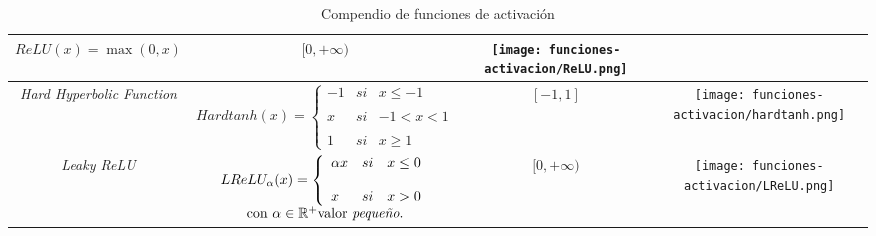 \begin{table}[H]
{\begin{tabular}{| c | c | c | c |}
        $ReLU(x) = \max(0,x)$
        & %
        $[0,+\infty)$
        & %
        \begin{minipage}{\coeficienteAncho\textwidth}
            \texttt{[image: funciones-activacion/ReLU.png]}
        \end{minipage}
        \\
        \hline
        \textit{Hard Hyperbolic Function}
        & %
        $Hardtanh(x) =\left\{ \begin{array}{lcc}
            -1 &   si  & x \leq -1 \\
            \\ x &  si & -1< x < 1 \\
            \\ 1&  si  & x \geq 1 
            \end{array}
        \right.$
        & %
        $[-1,1]$
        & %
        \begin{minipage}{\coeficienteAncho\textwidth}
            \texttt{[image: funciones-activacion/hardtanh.png]}
        \end{minipage}
        \\
        \hline
        \textit{Leaky ReLU}
        & %
        $\begin{array}{c}

            LReLU_{\alpha}(x) =\left\{ \begin{array}{lcc}
            \alpha x &   si  & x \leq 0 \\
            \\ x&  si  & x > 0 
            \end{array}
            \right.
        \\
        \text{con } \alpha \in \R^+ \text{valor }\textit{pequeño}.
        \end{array}
        $
        & %
        $[0, +\infty)$
        & %
        \begin{minipage}{\coeficienteAncho\textwidth}
            \texttt{[image: funciones-activacion/LReLU.png]}
        \end{minipage}
        \\
        \hline
    \end{tabular}
    } %
    \caption{Compendio de funciones de activación}  
    \label{table:funciones-de-activation}
\end{table}

